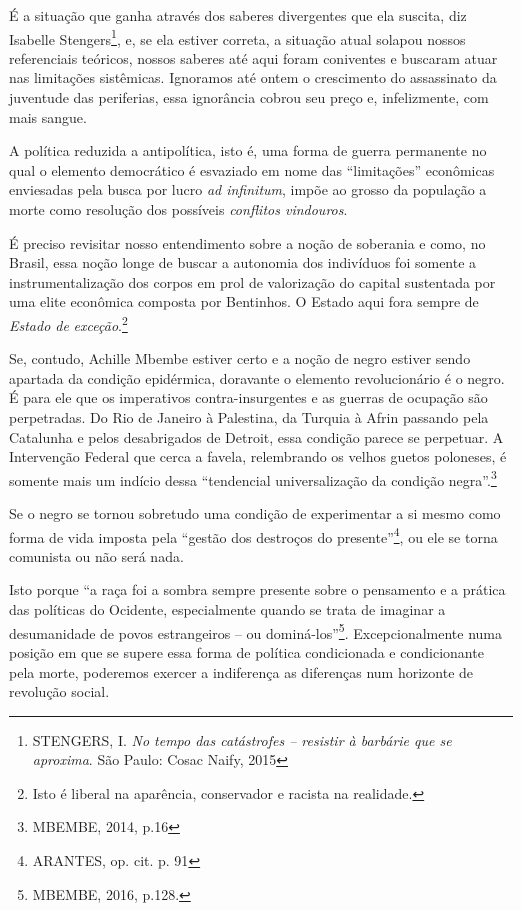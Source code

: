 É a situação que ganha através dos saberes divergentes que ela suscita,
diz Isabelle Stengers\footnote{STENGERS, I. \emph{No tempo das
  catástrofes -- resistir à barbárie que se aproxima}. São Paulo: Cosac
  Naify, 2015}, e, se ela estiver correta, a situação atual solapou
nossos referenciais teóricos, nossos saberes até aqui foram coniventes e
buscaram atuar nas limitações sistêmicas. Ignoramos até ontem o
crescimento do assassinato da juventude das periferias, essa ignorância
cobrou seu preço e, infelizmente, com mais sangue.

A política reduzida a antipolítica, isto é, uma forma de guerra
permanente no qual o elemento democrático é esvaziado em nome das
``limitações'' econômicas enviesadas pela busca por lucro \emph{ad
infinitum}, impõe ao grosso da população a morte como resolução dos
possíveis \emph{conflitos vindouros}.

É preciso revisitar nosso entendimento sobre a noção de soberania e
como, no Brasil, essa noção longe de buscar a autonomia dos indivíduos
foi somente a instrumentalização dos corpos em prol de valorização do
capital sustentada por uma elite econômica composta por Bentinhos. O
Estado aqui fora sempre de \emph{Estado de} \emph{exceção}.\footnote{Isto
  é liberal na aparência, conservador e racista na realidade.}

Se, contudo, Achille Mbembe estiver certo e a noção de negro estiver
sendo apartada da condição epidérmica, doravante o elemento
revolucionário é o negro. É para ele que os imperativos
contra-insurgentes e as guerras de ocupação são perpetradas. Do Rio de
Janeiro à Palestina, da Turquia à Afrin passando pela Catalunha e pelos
desabrigados de Detroit, essa condição parece se perpetuar. A
Intervenção Federal que cerca a favela, relembrando os velhos guetos
poloneses, é somente mais um indício dessa ``tendencial universalização
da condição negra''.\footnote{MBEMBE, 2014, p.16}

Se o negro se tornou sobretudo uma condição de experimentar a si mesmo
como forma de vida imposta pela ``gestão dos destroços do
presente''\footnote{ARANTES, op. cit. p. 91}, ou ele se torna comunista
ou não será nada.

Isto porque ``a raça foi a sombra sempre presente sobre o pensamento e a
prática das políticas do Ocidente, especialmente quando se trata de
imaginar a desumanidade de povos estrangeiros -- ou
dominá-los''\footnote{MBEMBE, 2016, p.128.}. Excepcionalmente numa
posição em que se supere essa forma de política condicionada e
condicionante pela morte, poderemos exercer a indiferença as diferenças
num horizonte de revolução social.

